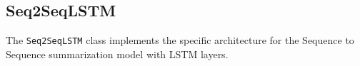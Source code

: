 \subsection{Seq2SeqLSTM}
The \texttt{Seq2SeqLSTM} class implements the specific architecture for the Sequence to Sequence summarization model with LSTM layers.


